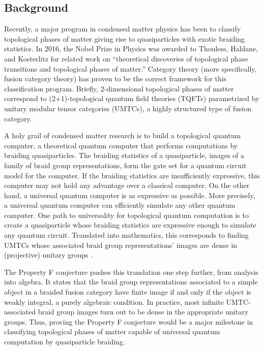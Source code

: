 \documentclass[12pt]{article}
\theoremstyle{plain} \numberwithin{equation}{section}
\theoremstyle{definition}
\begin{document}
\subsection*{Background}

Recently, a major program in condensed matter physics has been to classify topological phases of matter giving rise to quasiparticles with exotic braiding statistics. In 2016, the Nobel Prize in Physics was awarded to Thouless, Haldane, and Kosterlitz for related work on ``theoretical discoveries of topological phase transitions and topological phases of matter.'' Category theory (more specifically, fusion category theory) has proven to be the correct framework for this classification program. Briefly, 2-dimensional topological phases of matter correspond to (2+1)-topological quantum field theories (TQFTs) parametrized by unitary modular tensor categories (UMTCs), a highly structured type of fusion category. 

A holy grail of condensed matter research is to build a topological quantum computer, a theoretical quantum computer that performs computations by braiding quasiparticles. The braiding statistics of a quasiparticle, images of a family of braid group representations, form the gate set for a quantum circuit model for the computer. If the braiding statistics are insufficiently expressive, this computer may not hold any advantage over a classical computer. On the other hand, a universal quantum computer is as expressive as possible. More precisely, a universal quantum computer can efficiently simulate any other quantum computer.  One path to universality for topological quantum computation is to create a quasiparticle whose braiding statistics are expressive enough to simulate any quantum circuit.  Translated into mathematics, this corresponds to finding UMTCs whose associated braid group representations' images are dense in (projective) unitary groups \cite{flw}.

The Property F conjecture \cite{nr} pushes this translation one step further, from analysis into algebra.  It states that the braid group representations associated to a simple object in a braided fusion category have finite image if and only if the object is weakly integral, a purely algebraic condition.  In practice, most infinite UMTC-associated braid group images turn out to be dense in the appropriate unitary groups.  Thus, proving the Property F conjecture would be a major milestone in classifying topological phases of matter capable of universal quantum computation by quasiparticle braiding.
\end{document}
